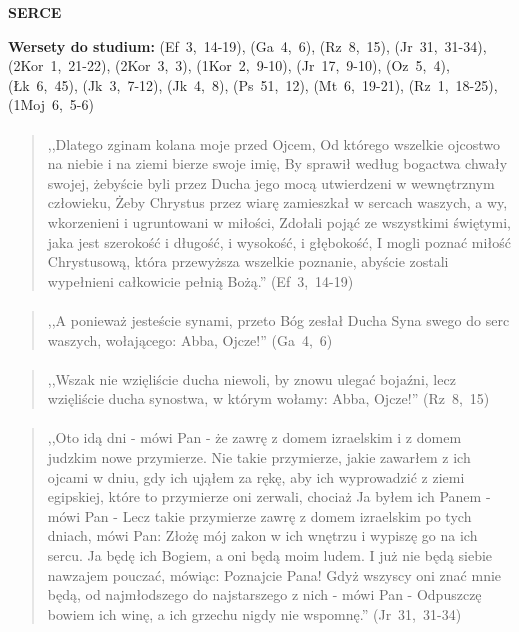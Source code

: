 \documentclass[10pt,a4paper,oneside]{article}
\begin{document}
\centerline{\textbf{\MakeUppercase{Serce}}}
\begin{center}
\textbf{Wersety do studium:} 
\mbox{(Ef 3, 14-19)}, \mbox{(Ga 4, 6)}, \mbox{(Rz 8, 15)}, \mbox{(Jr 31, 31-34)}, \mbox{(2Kor 1, 21-22)}, \mbox{(2Kor 3, 3)}, \mbox{(1Kor 2, 9-10)}, \mbox{(Jr 17, 9-10)}, \mbox{(Oz 5, 4)}, \mbox{(Łk 6, 45)}, \mbox{(Jk 3, 7-12)}, \mbox{(Jk 4, 8)}, \mbox{(Ps 51, 12)}, \mbox{(Mt 6, 19-21)}, \mbox{(Rz 1, 18-25)}, \mbox{(1Moj 6, 5-6)}
\end{center}
\paragraph{}
\begin{quote}
,,Dlatego zginam kolana moje przed Ojcem, Od którego wszelkie ojcostwo na niebie i na ziemi bierze swoje imię, By sprawił według bogactwa chwały swojej, żebyście byli przez Ducha jego mocą utwierdzeni w wewnętrznym człowieku, Żeby Chrystus przez wiarę zamieszkał w sercach waszych, a wy, wkorzenieni i ugruntowani w miłości, Zdołali pojąć ze wszystkimi świętymi, jaka jest szerokość i długość, i wysokość, i głębokość, I mogli poznać miłość Chrystusową, która przewyższa wszelkie poznanie, abyście zostali wypełnieni całkowicie pełnią Bożą.'' \mbox{(Ef 3, 14-19)}
\end{quote}
\paragraph{}
\begin{quote}
,,A ponieważ jesteście synami, przeto Bóg zesłał Ducha Syna swego do serc waszych, wołającego: Abba, Ojcze!'' \mbox{(Ga 4, 6)}
\end{quote}
\paragraph{}
\begin{quote}
,,Wszak nie wzięliście ducha niewoli, by znowu ulegać bojaźni, lecz wzięliście ducha synostwa, w którym wołamy: Abba, Ojcze!'' \mbox{(Rz 8, 15)}
\end{quote}
\paragraph{}
\begin{quote}
,,Oto idą dni - mówi Pan - że zawrę z domem izraelskim i z domem judzkim nowe przymierze. Nie takie przymierze, jakie zawarłem z ich ojcami w dniu, gdy ich ująłem za rękę, aby ich wyprowadzić z ziemi egipskiej, które to przymierze oni zerwali, chociaż Ja byłem ich Panem - mówi Pan - Lecz takie przymierze zawrę z domem izraelskim po tych dniach, mówi Pan: Złożę mój zakon w ich wnętrzu i wypiszę go na ich sercu. Ja będę ich Bogiem, a oni będą moim ludem. I już nie będą siebie nawzajem pouczać, mówiąc: Poznajcie Pana! Gdyż wszyscy oni znać mnie będą, od najmłodszego do najstarszego z nich - mówi Pan - Odpuszczę bowiem ich winę, a ich grzechu nigdy nie wspomnę.'' \mbox{(Jr 31, 31-34)}
\end{quote}
\end{document}
